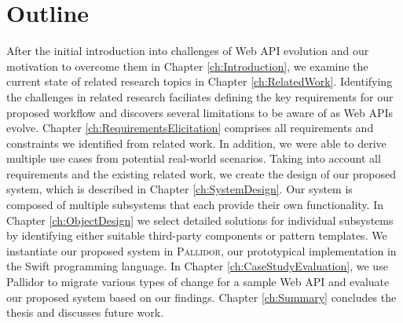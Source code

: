 \section{Outline}
\label{sec:Outline}

After the initial introduction into challenges of Web API evolution and our motivation to overcome them in Chapter \ref{ch:Introduction}, we examine the current state of related research topics in Chapter \ref{ch:RelatedWork}. Identifying the challenges in related research faciliates defining the key requirements for our proposed workflow and discovers several limitations to be aware of as Web APIs evolve. Chapter \ref{ch:RequirementsElicitation} comprises all requirements and constraints we identified from related work. In addition, we were able to derive multiple use cases from potential real-world scenarios. Taking into account all requirements and the existing related work, we create the design of our proposed system, which is described in Chapter \ref{ch:SystemDesign}. Our system is composed of multiple subsystems that each provide their own functionality. In Chapter \ref{ch:ObjectDesign} we select detailed solutions for individual subsystems by identifying either suitable third-party components or pattern templates. We instantiate our proposed system in \textsc{Pallidor}, our prototypical implementation in the Swift programming language. In Chapter \ref{ch:CaseStudyEvaluation}, we use Pallidor to migrate various types of change for a sample Web API and evaluate our proposed system based on our findings. Chapter \ref{ch:Summary} concludes the thesis and discusses future work.